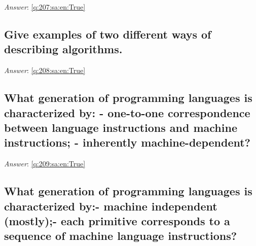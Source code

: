 \documentclass[a4paper,11pt,oneside]{article}
\begin{document}
\begin{sloppypar}
\label{q:207:sa:en:False}

\vspace{2cm}

\noindent\makebox[\textwidth]{\hrulefill}

\vspace{1cm}

\textit{Answer}: \autoref{q:207:sa:en:True}



\subsection{Give examples of two different ways of describing algorithms.}

\label{q:208:sa:en:False}

\vspace{2cm}

\noindent\makebox[\textwidth]{\hrulefill}

\vspace{1cm}

\textit{Answer}: \autoref{q:208:sa:en:True}



\subsection{What generation of programming languages is characterized by: - one-to-one correspondence between language instructions and machine instructions; - inherently machine-dependent?}

\label{q:209:sa:en:False}

\vspace{2cm}

\noindent\makebox[\textwidth]{\hrulefill}

\vspace{1cm}

\textit{Answer}: \autoref{q:209:sa:en:True}



\subsection{What generation of programming languages is characterized by:- machine independent (mostly);- each primitive corresponds to a sequence of machine language instructions?}

\label{q:210:sa:en:False}

\vspace{2cm}


\end{sloppypar}
\end{document}
